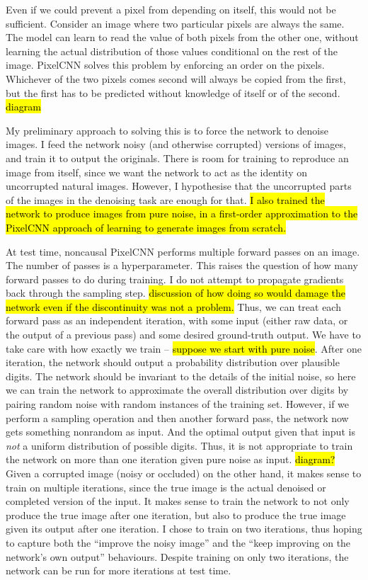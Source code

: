 \documentclass[11pt, a4paper]{book}
\newcommand{\nquote}[1]{``{#1}''}
\begin{document}
Even if we could prevent a pixel from depending on itself, this would not be sufficient. Consider an image where two particular pixels are always the same. The model can learn to read the value of both pixels from the other one, without learning the actual distribution of those values conditional on the rest of the image. PixelCNN solves this problem by enforcing an order on the pixels. Whichever of the two pixels comes second will always be copied from the first, but the first has to be predicted without knowledge of itself or of the second. \hl{diagram}

My preliminary approach to solving this is to force the network to denoise images. I feed the network noisy (and otherwise corrupted) versions of images, and train it to output the originals. There is room for training to reproduce an image from itself, since we want the network to act as the identity on uncorrupted natural images. However, I hypothesise that the uncorrupted parts of the images in the denoising task are enough for that. \hl{I also trained the network to produce images from pure noise, in a first-order approximation to the PixelCNN approach of learning to generate images from scratch.}

At test time, noncausal PixelCNN performs multiple forward passes on an image. The number of passes is a hyperparameter. This raises the question of how many forward passes to do during training. I do not attempt to propagate gradients back through the sampling step. \hl{discussion of how doing so would damage the network even if the discontinuity was not a problem.} Thus, we can treat each forward pass as an independent iteration, with some input (either raw data, or the output of a previous pass) and some desired ground-truth output. We have to take care with how exactly we train -- \hl{suppose we start with pure noise}. After one iteration, the network should output a probability distribution over plausible digits. The network should be invariant to the details of the initial noise, so here we can train the network to approximate the overall distribution over digits by pairing random noise with random instances of the training set. However, if we perform a sampling operation and then another forward pass, the network now gets something nonrandom as input. And the optimal output given that input is \emph{not} a uniform distribution of possible digits. Thus, it is not appropriate to train the network on more than one iteration given pure noise as input. \hl{diagram?} Given a corrupted image (noisy or occluded) on the other hand, it makes sense to train on multiple iterations, since the true image is the actual denoised or completed version of the input. It makes sense to train the network to not only produce the true image after one iteration, but also to produce the true image given its output after one iteration. I chose to train on two iterations, thus hoping to capture both the \nquote{improve the noisy image} and the \nquote{keep improving on the network's own output} behaviours. Despite training on only two iterations, the network can be run for more iterations at test time.
\end{document}

